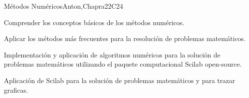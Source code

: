 \begin{syllabus}
\begin{unit}{Métodos Numéricos}{}{Anton,Chapra}{22}{C24}
   \begin{learningoutcomes}
      \item Comprender los conceptos básicos de los métodos numéricos.
      \item Aplicar los métodos más frecuentes para la resolución de problemas matemáticos.
      \item Implementación y aplicación de algoritmos numéricos para la solución de problemas matemáticos utilizando el paquete computacional Scilab open-source.
      \item Aplicación de Scilab para la solución de problemas matemáticos y para trazar  graficas.
      \end{learningoutcomes}
\end{unit}



\begin{coursebibliography}
\end{coursebibliography}

\end{syllabus}

